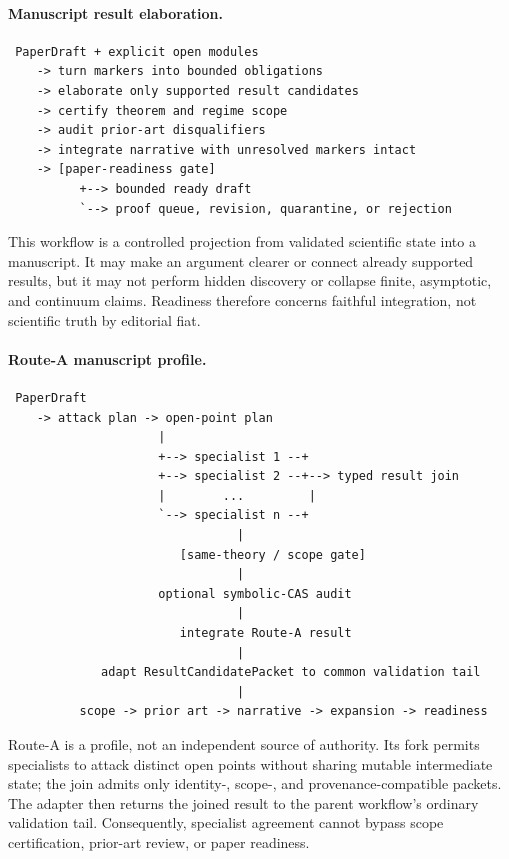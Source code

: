 \documentclass[11pt]{article}
\begin{document}
\paragraph{Manuscript result elaboration.}
\begin{verbatim}
 PaperDraft + explicit open modules
    -> turn markers into bounded obligations
    -> elaborate only supported result candidates
    -> certify theorem and regime scope
    -> audit prior-art disqualifiers
    -> integrate narrative with unresolved markers intact
    -> [paper-readiness gate]
          +--> bounded ready draft
          `--> proof queue, revision, quarantine, or rejection
\end{verbatim}
This workflow is a controlled projection from validated scientific state into
a manuscript.  It may make an argument clearer or connect already supported
results, but it may not perform hidden discovery or collapse finite,
asymptotic, and continuum claims.  Readiness therefore concerns faithful
integration, not scientific truth by editorial fiat.

\paragraph{Route-A manuscript profile.}
\begin{verbatim}
 PaperDraft
    -> attack plan -> open-point plan
                     |
                     +--> specialist 1 --+
                     +--> specialist 2 --+--> typed result join
                     |        ...         |
                     `--> specialist n --+
                                |
                        [same-theory / scope gate]
                                |
                     optional symbolic-CAS audit
                                |
                        integrate Route-A result
                                |
             adapt ResultCandidatePacket to common validation tail
                                |
          scope -> prior art -> narrative -> expansion -> readiness
\end{verbatim}
Route-A is a profile, not an independent source of authority.  Its fork permits
specialists to attack distinct open points without sharing mutable intermediate
state; the join admits only identity-, scope-, and provenance-compatible
packets.  The adapter then returns the joined result to the parent workflow's
ordinary validation tail.  Consequently, specialist agreement cannot bypass
scope certification, prior-art review, or paper readiness.
\end{document}
